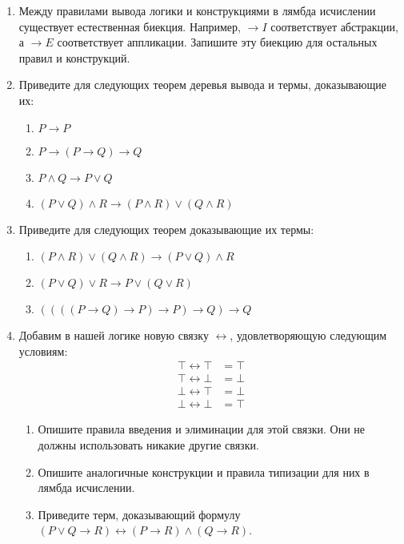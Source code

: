\begin{enumerate}

\item Между правилами вывода логики и конструкциями в лямбда исчислении существует естественная биекция.
    Например, $\to\!\!I$ соответствует абстракции, а $\to\!\!E$ соответствует аппликации.
    Запишите эту биекцию для остальных правил и конструкций.

\item Приведите для следующих теорем деревья вывода и термы, доказывающие их:
\begin{enumerate}
\item $P \to P$
\item $P \to (P \to Q) \to Q$
\item $P \land Q \to P \lor Q$
\item $(P \lor Q) \land R \to (P \land R) \lor (Q \land R)$
\end{enumerate}

\item Приведите для следующих теорем доказывающие их термы:
\begin{enumerate}
\item $(P \land R) \lor (Q \land R) \to (P \lor Q) \land R$
\item $(P \lor Q) \lor R \to P \lor (Q \lor R)$
\item $((((P \to Q) \to P) \to P) \to Q) \to Q$
\end{enumerate}

\item Добавим в нашей логике новую связку $\leftrightarrow$, удовлетворяющую следующим условиям:
\begin{align*}
\top \leftrightarrow \top & = \top \\
\top \leftrightarrow \bot & = \bot \\
\bot \leftrightarrow \top & = \bot \\
\bot \leftrightarrow \bot & = \top
\end{align*}
\begin{enumerate}
\item Опишите правила введения и элиминации для этой связки.
    Они не должны использовать никакие другие связки.
\item Опишите аналогичные конструкции и правила типизации для них в лямбда исчислении.
\item Приведите терм, доказывающий формулу $(P \lor Q \to R) \leftrightarrow (P \to R) \land (Q \to R)$.
\end{enumerate}

\end{enumerate}


